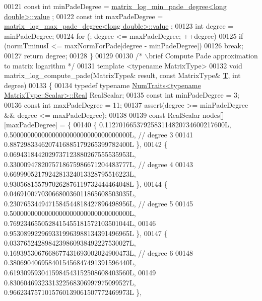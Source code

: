 \begin{DoxyCode}
00121   \textcolor{keyword}{const} \textcolor{keywordtype}{int} minPadeDegree = \hyperlink{struct_eigen_1_1internal_1_1matrix__log__min__pade__degree}{matrix\_log\_min\_pade\_degree<long double>::value}
      ;
00122   \textcolor{keyword}{const} \textcolor{keywordtype}{int} maxPadeDegree = \hyperlink{struct_eigen_1_1internal_1_1matrix__log__max__pade__degree}{matrix\_log\_max\_pade\_degree<long double>::value}
      ;
00123   \textcolor{keywordtype}{int} degree = minPadeDegree;
00124   \textcolor{keywordflow}{for} (; degree <= maxPadeDegree; ++degree)
00125     \textcolor{keywordflow}{if} (normTminusI <= maxNormForPade[degree - minPadeDegree])
00126       \textcolor{keywordflow}{break};
00127   \textcolor{keywordflow}{return} degree;
00128 \}
00129 
00130 \textcolor{comment}{/* \(\backslash\)brief Compute Pade approximation to matrix logarithm */}
00131 \textcolor{keyword}{template} <\textcolor{keyword}{typename} MatrixType>
00132 \textcolor{keywordtype}{void} matrix\_log\_compute\_pade(MatrixType& result, \textcolor{keyword}{const} MatrixType& \hyperlink{group___sparse_core___module}{T}, \textcolor{keywordtype}{int} degree)
00133 \{
00134   \textcolor{keyword}{typedef} \textcolor{keyword}{typename} \hyperlink{group___core___module_struct_eigen_1_1_num_traits}{NumTraits<typename MatrixType::Scalar>::Real}
       RealScalar;
00135   \textcolor{keyword}{const} \textcolor{keywordtype}{int} minPadeDegree = 3;
00136   \textcolor{keyword}{const} \textcolor{keywordtype}{int} maxPadeDegree = 11;
00137   assert(degree >= minPadeDegree && degree <= maxPadeDegree);
00138 
00139   \textcolor{keyword}{const} RealScalar nodes[][maxPadeDegree] = \{ 
00140     \{ 0.1127016653792583114820734600217600L, 0.5000000000000000000000000000000000L,  \textcolor{comment}{// degree 3}
00141       0.8872983346207416885179265399782400L \}, 
00142     \{ 0.0694318442029737123880267555535953L, 0.3300094782075718675986671204483777L,  \textcolor{comment}{// degree 4}
00143       0.6699905217924281324013328795516223L, 0.9305681557970262876119732444464048L \},
00144     \{ 0.0469100770306680036011865608503035L, 0.2307653449471584544818427896498956L,  \textcolor{comment}{// degree 5}
00145       0.5000000000000000000000000000000000L, 0.7692346550528415455181572103501044L,
00146       0.9530899229693319963988134391496965L \},
00147     \{ 0.0337652428984239860938492227530027L, 0.1693953067668677431693002024900473L,  \textcolor{comment}{// degree 6}
00148       0.3806904069584015456847491391596440L, 0.6193095930415984543152508608403560L,
00149       0.8306046932331322568306997975099527L, 0.9662347571015760139061507772469973L \},

\end{DoxyCode}
